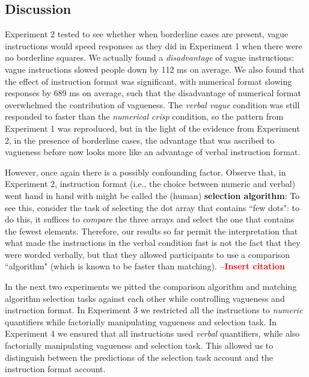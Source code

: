 \documentclass[%
man,		%
floatsintext,%
apacite%
]{apa6}
\begin{document}
\subsection{Discussion} %

Experiment 2 tested to see whether when borderline cases are present, vague instructions would speed responses as they did in Experiment 1 when there were no borderline squares. 
We actually found a \emph{disadvantage} of vague instructions: vague instructions slowed people down by 112 ms on average. We also found that the effect of instruction format was significant, with numerical format slowing responses by 689 ms on average, such that the disadvantage of numerical format overwhelmed the contribution of vagueness. The \emph{verbal vague} condition was still responded to faster than the \emph{numerical crisp} condition, so the pattern from Experiment 1 was reproduced, but in the light of the evidence from Experiment 2, in the presence of borderline cases, the advantage that was ascribed to vagueness before now looks more like an advantage of verbal instruction format.

However, once again there is a possibly confounding factor. Observe that, in Experiment 2, instruction format (i.e., the choice between numeric and verbal) went hand in hand with might be called the (human) {\bf selection algorithm}: To see this, consider the task of selecting the dot array that contains ``few dots": to do this, it suffices to {\em compare} the three arrays and select the one that contains the fewest elements. Therefore, our results so far permit the interpretation that what made the instructions in the verbal condition fast is not the fact that they were worded verbally, but that they allowed participants to use a comparison ``algorithm" (which is known to be faster than matching). %
\textcolor{red}{{\bf--Insert citation}}

In the next two experiments we pitted the comparison algorithm and matching algorithm selection tasks against each other while controlling vagueness and instruction format. In Experiment 3 we restricted all the instructions to \emph{numeric} quantifiers while factorially manipulating vagueness and selection task. In Experiment 4 we ensured that all instructions used \emph{verbal} quantifiers, while also factorially manipulating vagueness and selection task. This allowed us to distinguish between the predictions of the selection task account and the instruction format account. 
\end{document}
